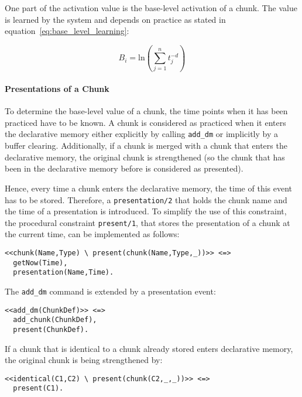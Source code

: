 One part of the activation value is the base-level activation of a chunk. The value is learned by the system and depends on practice as stated in equation~\eqref{eq:base_level_learning}:

\begin{equation*}
B_i = \mathrm{ln}\left(\sum_{j=1}^n{t_j^{-d}}\right) 
\end{equation*}

\paragraph{Presentations of a Chunk} 

To determine the base-level value of a chunk, the time points when it has been practiced have to be known. A chunk is considered as practiced when it enters the declarative memory either explicitly by calling \lstinline|add_dm| or implicitly by a buffer clearing. Additionally, if a chunk is merged with a chunk that enters the declarative memory, the original chunk is strengthened (so the chunk that has been in the declarative memory before is considered as presented). 

Hence, every time a chunk enters the declarative memory, the time of this event has to be stored. Therefore, a \lstinline|presentation/2| that holds the chunk name and the time of a presentation is introduced. To simplify the use of this constraint, the procedural constraint \lstinline|present/1|, that stores the presentation of a chunk at the current time, can be implemented as follows:

\begin{lstlisting}
<<chunk(Name,Type) \ present(chunk(Name,Type,_))>> <=> 
  getNow(Time),
  presentation(Name,Time).
\end{lstlisting}

The \lstinline|add_dm| command is extended by a presentation event:

\begin{lstlisting}
<<add_dm(ChunkDef)>> <=> 
  add_chunk(ChunkDef), 
  present(ChunkDef). 
\end{lstlisting}

If a chunk that is identical to a chunk already stored enters declarative memory, the original chunk is being strengthened by:

\begin{lstlisting}
<<identical(C1,C2) \ present(chunk(C2,_,_))>> <=> 
  present(C1).
\end{lstlisting}

